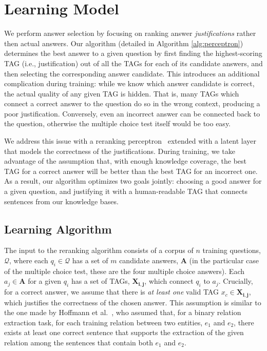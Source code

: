 \section{Learning Model}
\label{sec-cl2017:perceptron}

We perform answer selection by focusing on ranking answer {\em justifications} rather then actual answers. 
Our algorithm (detailed in Algorithm \ref{alg:perceptron}) determines the best answer to a given question by first finding the highest-scoring TAG (i.e., justification) out of all the TAGs for each of its candidate answers, and then selecting the corresponding answer candidate.  
This introduces an additional complication during training: while we know which answer candidate is correct, the actual quality of any given TAG is hidden. That is, many TAGs which connect a correct answer to the question do so in the wrong context, producing a poor justification. Conversely, even an incorrect answer can be connected back to the question, otherwise the multiple choice test itself would be too easy. 

We address this issue with a reranking perceptron~\cite{Shen:Joshi:2005,Surdeanu:11} extended with a latent layer that models the correctness of the justifications. 
During training, we take advantage of the assumption that, with enough knowledge coverage, the best TAG for a correct answer will be better than the best TAG for an incorrect one.  As a result, our algorithm optimizes two goals jointly: choosing a good answer for a given question, and justifying it with a human-readable TAG that connects sentences from our knowledge bases.

\subsection {Learning Algorithm}
\label{sec-cl2017:model}

The input to the reranking algorithm consists of a corpus of $n$ training questions, $\boldsymbol{\mathcal{Q}}$, where each $q_i \in \boldsymbol{\mathcal{Q}}$ has a set of $m$ candidate answers, $\boldsymbol{A}$ (in the particular case of the multiple choice test, these are the four multiple choice answers).  Each $a_j \in \boldsymbol{A}$ for a given $q_i$ has a set of TAGs, $\boldsymbol{X_{i,j}}$, which connect $q_i$ to $a_j$.  
Crucially, for a correct answer, we assume that there is {\em at least one} valid TAG $x_c \in \boldsymbol{X_{i,j}}$, which justifies the correctness of the chosen answer. This assumption is similar to the one made by Hoffmann et al.~\citeyear{hoffmann2011knowledge}, who assumed that, for a binary relation extraction task, for each training relation between two entities, $e_1$ and $e_2$, there exists at least one correct sentence that supports the extraction of the given relation among the sentences that contain both $e_1$ and $e_2$.

